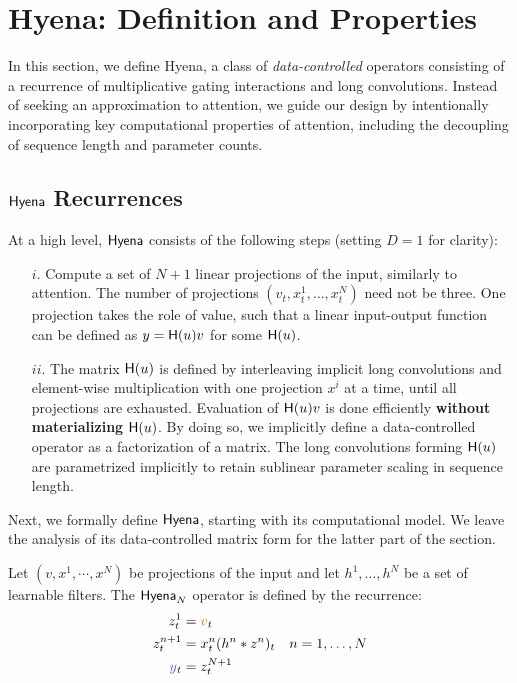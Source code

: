 \section{Hyena: Definition and Properties}\label{allofhyena}
%
In this section, we define Hyena, a class of \textit{data-controlled} operators consisting of a recurrence of multiplicative gating interactions and long convolutions. Instead of seeking an approximation to attention, we guide our design by intentionally incorporating key computational properties of attention, including the decoupling of sequence length and parameter counts.
%
\subsection{${\sf Hyena}$ Recurrences}\label{hyena_op}
%
At a high level, ${\sf Hyena}$ consists of the following steps (setting $D = 1$ for clarity):
\begin{itemize}
    \item[$i.$] Compute a set of $N + 1$ linear projections of the input, similarly to attention. The number of projections $(v_t, x^1_t, \dots, x^N_t)$ need not be three. One projection takes the role of value, such that a linear input-output function can be defined as $y = \mathsf{H}(u) v$ for some $\mathsf{H}(u)$.
    \item[$ii.$] The matrix $\mathsf{H}(u)$ is defined by interleaving implicit long convolutions and element-wise multiplication with one projection $x^i$ at a time, until all projections are exhausted. Evaluation of $\mathsf{H}(u) v$ is done efficiently \textbf{without materializing} $\mathsf{H}(u)$. By doing so, we implicitly define a data-controlled operator as a factorization of a matrix. The long convolutions forming $\mathsf{H}(u)$ are parametrized implicitly to retain sublinear parameter scaling in sequence length.
\end{itemize}
%
Next, we formally define ${\sf Hyena}$, starting with its computational model. We leave the analysis of its data-controlled matrix form for the latter part of the section.
%
\begin{tcolorbox}[enhanced, sharp corners, drop fuzzy shadow, frame hidden, colback=yellow!15]
\begin{definition} 
Let $(v, x^1, \cdots, x^N)$ be projections of the input and let $h^1,\dots, h^N$ be a set of learnable filters. The ${\sf Hyena}_N$ operator is defined by the recurrence:
%
\begin{equation}\label{eq:hyena}
    \begin{aligned}
        z^1_t &={\ocra v}_t\\
        z^{n+1}_t & = x_t^n (h^n * z^n)_t & n=1,\dots,N\\
        {\color{blue!70}y}_t &= z_t^{N+1}
    \end{aligned} 
\end{equation}
\end{definition}
\end{tcolorbox}
